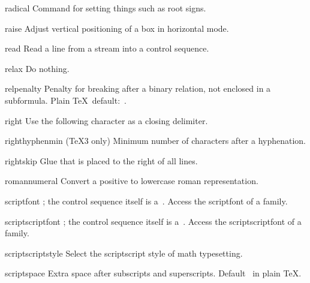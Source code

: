 \item radical
      Command for setting things such as root signs.

\item raise
      Adjust vertical positioning of a box in horizontal mode. 

\item read
      Read a line from a stream into a control sequence.

\item relax
      Do nothing.

\item relpenalty
      Penalty for breaking after a binary relation, not enclosed
      in a subformula.
      Plain \TeX\ default:~.

\item right
      Use the following character as a closing delimiter.

\item righthyphenmin
      (\TeX3 only) 
      Minimum number of characters after a hyphenation.

\item rightskip
      Glue that is placed to the right of all lines.

\item romannumeral
      Convert a positive
       to lowercase roman representation.

\item scriptfont
      ; the control sequence itself
      is a~.
      Access the scriptfont of a family.

\item scriptscriptfont
      ; the control sequence itself
      is a~.
      Access the scriptscriptfont of a family.

\item scriptscriptstyle
      Select the scriptscript style of math typesetting.

\item scriptspace
      Extra space after subscripts and superscripts.
      Default~\n{.5pt}      in plain \TeX.

